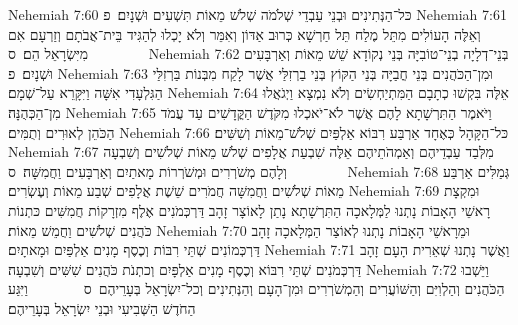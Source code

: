 Nehemiah 7:60	כּל־הַנְּתִינִים וּבְנֵי עַבְדֵי שְׁלֹמֹה שְׁלֹשׁ מֵאוֹת תִּשְׁעִים וּשְׁנָיִם׃ {פ}
Nehemiah 7:61	וְאֵלֶּה הָעוֹלִים מִתֵּל מֶלַח תֵּל חַרְשָׁא כְּרוּב אַדּוֹן וְאִמֵּר וְלֹא יָכְלוּ לְהַגִּיד בֵּית־אֲבֹתָם וְזַרְעָם אִם מִיִּשְׂרָאֵל הֵם׃ {ס}        
Nehemiah 7:62	בְּנֵי־דְלָיָה בְנֵי־טוֹבִיָּה בְּנֵי נְקוֹדָא שֵׁשׁ מֵאוֹת וְאַרְבָּעִים וּשְׁנָיִם׃ {פ}
Nehemiah 7:63	וּמִן־הַכֹּהֲנִים בְּנֵי חֳבַיָּה בְּנֵי הַקּוֹץ בְּנֵי בַרְזִלַּי אֲשֶׁר לָקַח מִבְּנוֹת בַּרְזִלַּי הַגִּלְעָדִי אִשָּׁה וַיִּקָּרֵא עַל־שְׁמָם׃
Nehemiah 7:64	אֵלֶּה בִּקְשׁוּ כְתָבָם הַמִּתְיַחְשִׂים וְלֹא נִמְצָא וַיְגֹאֲלוּ מִן־הַכְּהֻנָּה׃
Nehemiah 7:65	וַיֹּאמֶר הַתִּרְשָׁתָא לָהֶם אֲשֶׁר לֹא־יֹאכְלוּ מִקֹּדֶשׁ הַקֳּדָשִׁים עַד עֲמֹד הַכֹּהֵן לְאוּרִים וְתֻמִּים׃
Nehemiah 7:66	כּל־הַקָּהָל כְּאֶחָד אַרְבַּע רִבּוֹא אַלְפַּיִם שְׁלֹשׁ־מֵאוֹת וְשִׁשִּׁים׃
Nehemiah 7:67	מִלְּבַד עַבְדֵיהֶם וְאַמְהֹתֵיהֶם אֵלֶּה שִׁבְעַת אֲלָפִים שְׁלֹשׁ מֵאוֹת שְׁלֹשִׁים וְשִׁבְעָה וְלָהֶם מְשֹׁרְרִים וּמְשֹׁרְרוֹת מָאתַיִם וְאַרְבָּעִים וַחֲמִשָּׁה׃ {ס}        
Nehemiah 7:68	גְּמַלִּים אַרְבַּע מֵאוֹת שְׁלֹשִׁים וַחֲמִשָּׁה חֲמֹרִים שֵׁשֶׁת אֲלָפִים שְׁבַע מֵאוֹת וְעֶשְׂרִים׃
Nehemiah 7:69	וּמִקְצָת רָאשֵׁי הָאָבוֹת נָתְנוּ לַמְּלָאכָה הַתִּרְשָׁתָא נָתַן לָאוֹצָר זָהָב דַּרְכְּמֹנִים אֶלֶף מִזְרָקוֹת חֲמִשִּׁים כּתְנוֹת כֹּהֲנִים שְׁלֹשִׁים וַחֲמֵשׁ מֵאוֹת׃
Nehemiah 7:70	וּמֵרָאשֵׁי הָאָבוֹת נָתְנוּ לְאוֹצַר הַמְּלָאכָה זָהָב דַּרְכְּמוֹנִים שְׁתֵּי רִבּוֹת וְכֶסֶף מָנִים אַלְפַּיִם וּמָאתָיִם׃
Nehemiah 7:71	וַאֲשֶׁר נָתְנוּ שְׁאֵרִית הָעָם זָהָב דַּרְכְּמֹנִים שְׁתֵּי רִבּוֹא וְכֶסֶף מָנִים אַלְפָּיִם וְכתְנֹת כֹּהֲנִים שִׁשִּׁים וְשִׁבְעָה׃
Nehemiah 7:72	וַיֵּשְׁבוּ הַכֹּהֲנִים וְהַלְוִיִּם וְהַשּׁוֹעֲרִים וְהַמְשֹׁרְרִים וּמִן־הָעָם וְהַנְּתִינִים וְכל־יִשְׂרָאֵל בְּעָרֵיהֶם {ס}        וַיִּגַּע הַחֹדֶשׁ הַשְּׁבִיעִי וּבְנֵי יִשְׂרָאֵל בְּעָרֵיהֶם׃
